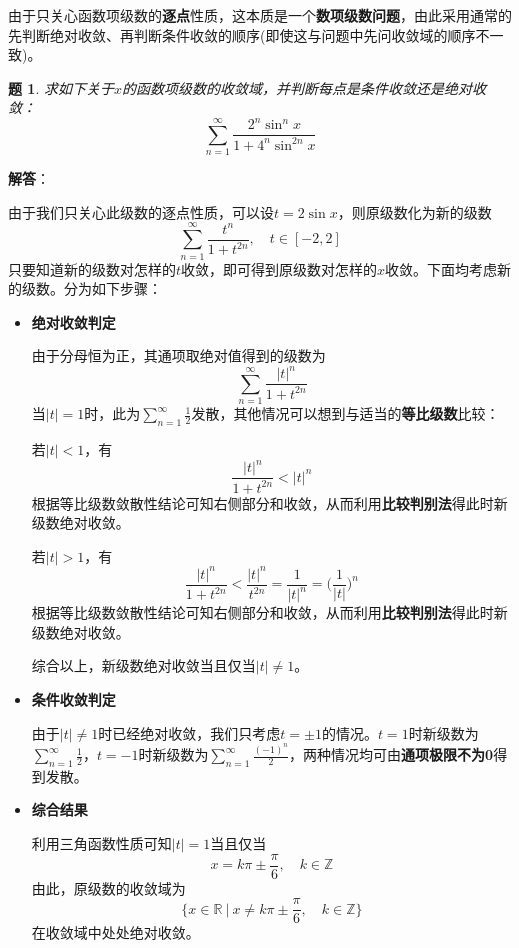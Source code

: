 \documentclass[a4paper,UTF8,fontset=windows,AutoFakeBold]{ctexart}
\newcommand*{\rb}{\mathbb{R}}
\newcommand*{\suminf}[1][n=1]{\sum_{#1}^\infty}
\newcommand*{\note}{\noindent *}
\theoremstyle{ex}
\newtheorem{exercise}{题}
\newcommand{\sol}[1]{{\vspace{5pt}\kaishu\noindent\textbf{解答}：\vspace{-3pt}
\begin{compactitem}
    \item[] #1
\end{compactitem}
}}
\begin{document}
\note 由于只关心函数项级数的\textbf{逐点}性质，这本质是一个\textbf{数项级数问题}，由此采用通常的先判断绝对收敛、再判断条件收敛的顺序(即使这与问题中先问收敛域的顺序不一致)。

\begin{framed}
\begin{exercise}
    求如下关于$x$的函数项级数的收敛域，并判断每点是条件收敛还是绝对收敛：
    $$\suminf\frac{2^n\sin^nx}{1+4^n\sin^{2n}x}$$
\end{exercise}
\sol{
    由于我们只关心此级数的逐点性质，可以设$t=2\sin x$，则原级数化为新的级数
    $$\suminf\frac{t^n}{1+t^{2n}},\quad t\in[-2,2]$$
    只要知道新的级数对怎样的$t$收敛，即可得到原级数对怎样的$x$收敛。下面均考虑新的级数。分为如下步骤：
    \begin{itemize}
        \item \textbf{绝对收敛判定}
        
        由于分母恒为正，其通项取绝对值得到的级数为
        $$\suminf\frac{|t|^n}{1+t^{2n}}$$
        当$|t|=1$时，此为$\suminf\frac{1}{2}$发散，其他情况可以想到与适当的\textbf{等比级数}比较：

        若$|t|<1$，有
        $$\frac{|t|^n}{1+t^{2n}}<|t|^n$$
        根据等比级数敛散性结论可知右侧部分和收敛，从而利用\textbf{比较判别法}得此时新级数绝对收敛。

        若$|t|>1$，有
        $$\frac{|t|^n}{1+t^{2n}}<\frac{|t|^n}{t^{2n}}=\frac{1}{|t|^n}=\bigg(\frac{1}{|t|}\bigg)^n$$
        根据等比级数敛散性结论可知右侧部分和收敛，从而利用\textbf{比较判别法}得此时新级数绝对收敛。

        综合以上，新级数绝对收敛当且仅当$|t|\ne1$。

        \item \textbf{条件收敛判定}
        
        由于$|t|\ne1$时已经绝对收敛，我们只考虑$t=\pm1$的情况。$t=1$时新级数为$\suminf\frac{1}{2}$，$t=-1$时新级数为$\suminf\frac{(-1)^n}{2}$，两种情况均可由\textbf{通项极限不为0}得到发散。

        \item \textbf{综合结果}
        
        利用三角函数性质可知$|t|=1$当且仅当
        $$x=k\pi\pm\frac{\pi}{6},\quad k\in\mathbb{Z}$$
        由此，原级数的收敛域为
        $$\bigg\{x\in\rb\ \bigg|\ x\ne k\pi\pm\frac{\pi}{6},\quad k\in\mathbb{Z}\bigg\}$$
        在收敛域中处处绝对收敛。
    \end{itemize}
}
\end{framed}
\end{document}

